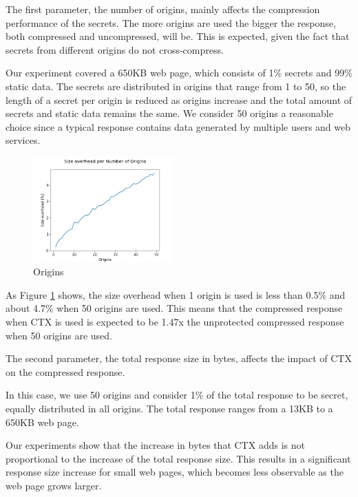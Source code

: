 The first parameter, the number of origins, mainly affects the compression
performance of the secrets. The more origins are used the bigger the response,
both compressed and uncompressed, will be. This is expected, given the fact that
secrets from different origins do not cross-compress.

Our experiment covered a 650KB web page, which consists of 1\% secrets and 99\%
static data. The secrets are distributed in origins that range from 1 to 50, so
the length of a secret per origin is reduced as origins increase and the total
amount of secrets and static data remains the same. We consider 50 origins a
reasonable choice since a typical response contains data generated by multiple
users and web services.

    \begin{figure}[thpb]
        \centering
            \includegraphics[width=0.48\textwidth]{experiments/origins.png}
        \caption{Origins}
        \label{fig:origin_ctx}
    \end{figure}

As Figure \ref{fig:origin_ctx} shows, the size overhead when 1 origin is used is less than 0.5\%
and about 4.7\% when 50 origins are used. This means that the compressed
response when CTX is used is expected to be 1.47x the unprotected compressed
response when 50 origins are used.

The second parameter, the total response size in bytes, affects the impact of
CTX on the compressed response.

In this case, we use 50 origins and consider 1\% of the total response to be
secret, equally distributed in all origins. The total response ranges from a
13KB to a 650KB web page.

Our experiments show that the increase in bytes that CTX adds is not
proportional to the increase of the total response size. This results in a
significant response size increase for small web pages, which becomes less
observable as the web page grows larger.

